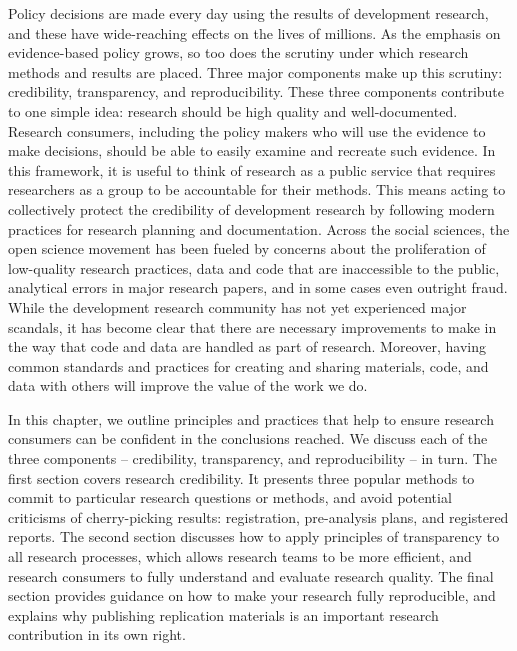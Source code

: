 
\begin{fullwidth}

	Policy decisions are made every day using the results of development research,
and these have wide-reaching effects on the lives of millions.
As the emphasis on evidence-based policy grows,
so too does the scrutiny under which research methods and results are placed.
Three major components make up this scrutiny:
credibility, transparency, and reproducibility.
These three components contribute to one simple idea:
research should be high quality and well-documented.
Research consumers, including the policy makers who will use the evidence to make decisions,
should be able to easily examine and recreate such evidence.
In this framework, it is useful to think of research as a public service
that requires researchers as a group to be accountable for their methods.
This means acting to collectively protect the credibility of development research
by following modern practices for research planning and documentation.
Across the social sciences, the open science movement has been fueled
by concerns about the proliferation of low-quality research practices,
data and code that are inaccessible to the public,
analytical errors in major research papers,
and in some cases even outright fraud.
While the development research community has not yet
experienced major scandals,
it has become clear that there are necessary improvements to make
in the way that code and data are handled as part of research.
Moreover, having common standards and practices
for creating and sharing materials, code, and data with others
will improve the value of the work we do.

In this chapter, we outline principles and practices that help to ensure
research consumers can be confident in the conclusions reached.
We discuss each of the three components --
credibility, transparency, and reproducibility -- in turn.
The first section covers research credibility.
It presents three popular methods to commit to particular research questions or methods,
and avoid potential criticisms of cherry-picking results:
registration, pre-analysis plans, and registered reports.
The second section discusses how to apply principles of transparency to all research processes,
which allows research teams to be more efficient, and
research consumers to fully understand and evaluate research quality.
The final section provides guidance on how to make your research fully reproducible,
and explains why publishing replication materials is an important research contribution in its own right.

\end{fullwidth}

